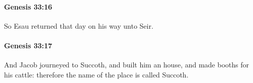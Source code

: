 		\paragraph{Genesis 33:16} %
			\label{GENESIS-33-16}

			So Esau returned that day on his way unto Seir.


		\paragraph{Genesis 33:17} %
			\label{GENESIS-33-17}

			And Jacob journeyed to Succoth, and built him an house, and made booths for his cattle: therefore the name of the place is called Succoth.


